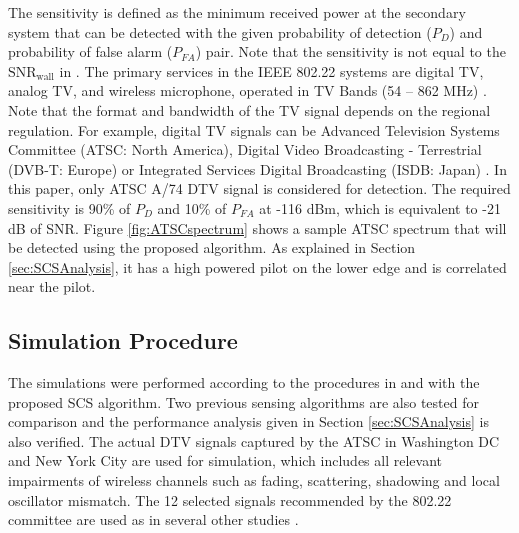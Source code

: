 \documentclass[draftclsnofoot,onecolumn,12pt]{IEEEtran}
\begin{document}
The sensitivity is defined as the minimum received power at the secondary system that can be detected
with the given probability of detection ($P_D$) and  probability of false alarm ($P_{FA}$) pair. Note
that the sensitivity is not equal to the $\mathrm{SNR_{wall}}$ in \cite{TanSah08}. The primary services in
the IEEE 802.22 systems are digital TV, analog TV, and wireless microphone, operated in TV Bands
(54 -- 862 MHz) \cite{FCC08-260, 802.22_Req}. 
Note that the format and bandwidth of the TV signal depends on the
regional regulation. For example, digital TV signals can be Advanced Television Systems Committee (ATSC: North America),
Digital Video Broadcasting - Terrestrial (DVB-T: Europe)
or Integrated Services Digital Broadcasting (ISDB: Japan) \cite{SteCho09, CorGho07}. In this paper, only ATSC A/74 DTV signal
\cite{ATSC:A74} is considered for detection.
The required sensitivity is 90\% of $P_D$ and 10\% of $P_{FA}$ at -116 dBm, which is equivalent to -21 dB of SNR. 
Figure \ref{fig:ATSCspectrum} shows a sample ATSC spectrum that will be detected using the proposed algorithm.
As explained in Section \ref{sec:SCSAnalysis}, it has a high powered pilot on the lower edge and is correlated near the pilot.


\subsection{Simulation Procedure}
\label{subsec:SimProcedure}

The simulations were performed according to the procedures in \cite{802.22_Sim_model} and
\cite{802.22:InitialSigProc} with the proposed SCS algorithm. Two previous sensing algorithms are
also tested for comparison and the performance analysis given in Section \ref{sec:SCSAnalysis} is also verified.
The actual DTV signals captured by the ATSC in
Washington DC and New York City are used for simulation, which includes all relevant impairments of
wireless channels such as fading, scattering, shadowing and local oscillator mismatch. The
12 selected signals recommended by the 802.22 committee \cite{802.22_Sim_model} are used as in several other studies \cite{CorGho07, ZenLia09, CheGao07}.
\end{document}
